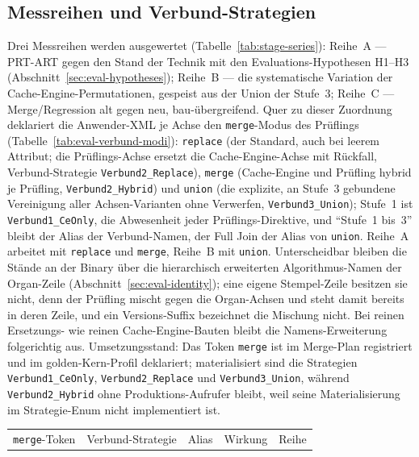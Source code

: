 \begin{nurlang}
\subsection{Messreihen und Verbund-Strategien}\label{sec:eval-series}
Drei Messreihen werden ausgewertet (Tabelle~\ref{tab:stage-series}): Reihe~A --- PRT-ART gegen den
Stand der Technik mit den Evaluations-Hypothesen H1--H3 (Abschnitt~\ref{sec:eval-hypotheses}); Reihe~B
--- die systematische Variation der Cache-Engine-Permutationen, gespeist aus der Union der Stufe~3;
Reihe~C --- Merge/Regression alt gegen neu, bau-übergreifend. Quer zu dieser Zuordnung deklariert die
Anwender-XML je Achse den \texttt{merge}-Modus des Prüflings (Tabelle~\ref{tab:eval-verbund-modi}):
\texttt{replace} (der Standard, auch bei leerem Attribut; die Prüflings-Achse ersetzt die
Cache-Engine-Achse mit Rückfall, Verbund-Strategie \texttt{Verbund2\_Replace}), \texttt{merge}
(Cache-Engine und Prüfling hybrid je Prüfling, \texttt{Verbund2\_Hybrid}) und \texttt{union} (die
explizite, an Stufe~3 gebundene Vereinigung aller Achsen-Varianten ohne Verwerfen,
\texttt{Verbund3\_Union}); Stufe~1 ist \texttt{Verbund1\_CeOnly}, die Abwesenheit jeder
Prüflings-Direktive, und \enquote{Stufe~1 bis~3} bleibt der Alias der Verbund-Namen, der Full Join
der Alias von \texttt{union}. Reihe~A arbeitet mit \texttt{replace} und \texttt{merge}, Reihe~B mit
\texttt{union}. Unterscheidbar bleiben die Stände an der Binary über die hierarchisch erweiterten
Algorithmus-Namen der Organ-Zeile (Abschnitt~\ref{sec:eval-identity}); eine eigene Stempel-Zeile
besitzen sie nicht, denn der Prüfling mischt gegen die Organ-Achsen und steht damit bereits in deren
Zeile, und ein Versions-Suffix bezeichnet die Mischung nicht. Bei reinen Ersetzungs- wie reinen
Cache-Engine-Bauten bleibt die Namens-Erweiterung folgerichtig aus. Umsetzungsstand: Das Token
\texttt{merge} ist im Merge-Plan registriert und im golden-Kern-Profil deklariert; materialisiert
sind die Strategien \texttt{Verbund1\_CeOnly}, \texttt{Verbund2\_Replace} und
\texttt{Verbund3\_Union}, während \texttt{Verbund2\_Hybrid} ohne Produktions-Aufrufer bleibt, weil
seine Materialisierung im Strategie-Enum nicht implementiert ist.
\begin{table}[htbp]\centering\footnotesize
\begin{tabular}{@{}ll>{\raggedright\arraybackslash}p{2.2cm}>{\raggedright\arraybackslash}p{4.4cm}>{\raggedright\arraybackslash}p{1.6cm}@{}}
\toprule
\texttt{merge}-Token & Verbund-Strategie & Alias & Wirkung & Reihe \\

\end{tabular}
\end{table}
\end{nurlang}
